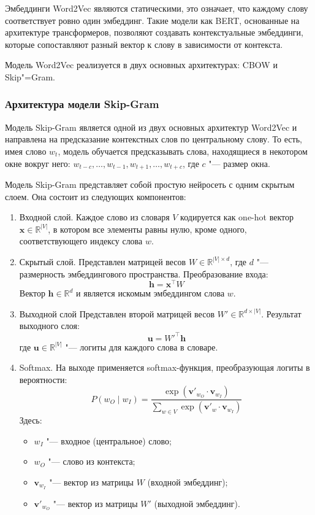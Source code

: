 \documentclass[coursework]{SCWorks}
\begin{document}
Эмбеддинги Word2Vec являются статическими, это означает, что каждому слову соответствует ровно один эмбеддинг. Такие модели как BERT, основанные на архитектуре трансформеров, позволяют создавать контекстуальные эмбеддинги, которые сопоставляют разный вектор к слову в зависимости от контекста.

Модель Word2Vec реализуется в двух основных архитектурах: CBOW и Skip"=Gram.

\subsubsection{Архитектура модели Skip-Gram}

Модель Skip-Gram является одной из двух основных архитектур Word2Vec и направлена на предсказание контекстных слов по центральному слову. То есть, имея слово $w_t$, модель обучается предсказывать слова, находящиеся в некотором окне вокруг него: $w_{t-c}, \dots, w_{t-1}, w_{t+1}, \dots, w_{t+c}$, где $c$ "--- размер окна.


Модель Skip-Gram представляет собой простую нейросеть с одним скрытым слоем. Она состоит из следующих компонентов:

\begin{enumerate}
  \item Входной слой.
  Каждое слово из словаря $V$ кодируется как one-hot вектор $\mathbf{x} \in \mathbb{R}^{|V|}$, в котором все элементы равны нулю, кроме одного, соответствующего индексу слова $w$.

  \item Скрытый слой.
  Представлен матрицей весов $W \in \mathbb{R}^{|V| \times d}$, где $d$ "--- размерность эмбеддингового пространства. Преобразование входа:
  \[
  \mathbf{h} = \mathbf{x}^\top W
  \]
  Вектор $\mathbf{h} \in \mathbb{R}^d$ и является искомым эмбеддингом слова $w$.

  \item Выходной слой 
  Представлен второй матрицей весов $W' \in \mathbb{R}^{d \times |V|}$. Результат выходного слоя:
  \[
  \mathbf{u} = W'^\top \mathbf{h}
  \]
  где $\mathbf{u} \in \mathbb{R}^{|V|}$ "--- логиты для каждого слова в словаре.

  \item Softmax.
  На выходе применяется softmax-функция, преобразующая логиты в вероятности:
  \[
  P(w_O \mid w_I) = \frac{\exp(\mathbf{v}'_{w_O} \cdot \mathbf{v}_{w_I})}{\sum_{w \in V} \exp(\mathbf{v}'_w \cdot \mathbf{v}_{w_I})}
  \]
  Здесь:
  \begin{itemize}
    \item $w_I$ "--- входное (центральное) слово;
    \item $w_O$ "--- слово из контекста;
    \item $\mathbf{v}_{w_I}$ "--- вектор из матрицы $W$ (входной эмбеддинг);
    \item $\mathbf{v}'_{w_O}$ "--- вектор из матрицы $W'$ (выходной эмбеддинг).
  \end{itemize}
\end{enumerate}
\end{document}
